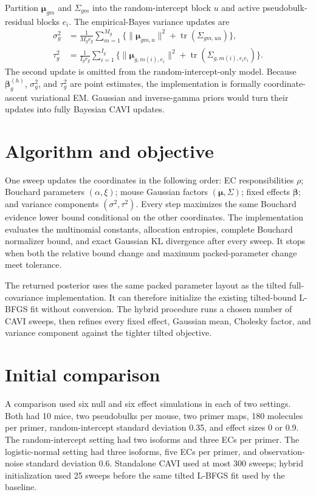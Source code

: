 \documentclass[11pt]{article}
\begin{document}
Partition \(\bm\mu_{gm}\) and \(\Sigma_{gm}\) into the random-intercept block \(u\) and active pseudobulk-residual blocks \(e_i\). The empirical-Bayes variance updates are \begin{align}
 \sigma_g^2
 &=\frac1{M_gr_g}\sum_{m=1}^{M_g}
 \{\|\bm\mu_{gm,u}\|^2+\operatorname{tr}(\Sigma_{gm,uu})\},\\
 \tau_g^2
 &=\frac1{I_gr_g}\sum_{i=1}^{I_g}
 \{\|\bm\mu_{g,m(i),e_i}\|^2
 +\operatorname{tr}(\Sigma_{g,m(i),e_ie_i})\}.
\end{align}
The second update is omitted from the random-intercept-only model. Because \(\bm\beta_g^{(h)}\), \(\sigma_g^2\), and \(\tau_g^2\) are point estimates, the implementation is formally coordinate-ascent variational EM. Gaussian and inverse-gamma priors would turn their updates into fully Bayesian CAVI updates.

\section{Algorithm and objective}

One sweep updates the coordinates in the following order: EC responsibilities \(\rho\); Bouchard parameters \((\alpha,\xi)\); mouse Gaussian factors \((\bm\mu,\Sigma)\); fixed effects \(\bm\beta\); and variance components \((\sigma^2,\tau^2)\). Every step maximizes the same Bouchard evidence lower bound conditional on the other coordinates. The implementation evaluates the multinomial constants, allocation entropies, complete Bouchard normalizer bound, and exact Gaussian KL divergence after every sweep. It stops when both the relative bound change and maximum packed-parameter change meet tolerance.

The returned posterior uses the same packed parameter layout as the tilted full-covariance implementation. It can therefore initialize the existing tilted-bound L-BFGS fit without conversion. The hybrid procedure runs a chosen number of CAVI sweeps, then refines every fixed effect, Gaussian mean, Cholesky factor, and variance component against the tighter tilted objective.

\section{Initial comparison}

A comparison used six null and six effect simulations in each of two settings. Both had 10 mice, two pseudobulks per mouse, two primer maps, 180 molecules per primer, random-intercept standard deviation 0.35, and effect sizes 0 or 0.9. The random-intercept setting had two isoforms and three ECs per primer. The logistic-normal setting had three isoforms, five ECs per primer, and observation-noise standard deviation 0.6. Standalone CAVI used at most 300 sweeps; hybrid initialization used 25 sweeps before the same tilted L-BFGS fit used by the baseline.
\end{document}
